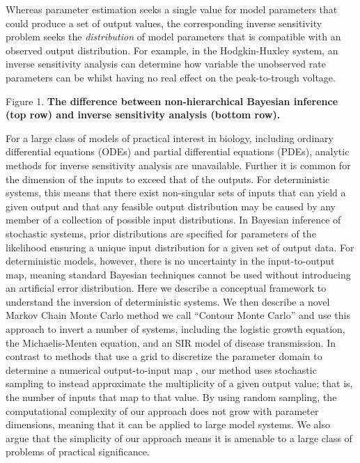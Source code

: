\documentclass[10pt,letterpaper]{article}
\begin{document}
Whereas parameter estimation seeks a single value for model parameters that could produce a set of output values, the corresponding inverse sensitivity problem seeks the \emph{distribution} of model parameters that is compatible with an observed output distribution. For example, in the Hodgkin-Huxley system, an inverse sensitivity analysis can determine how variable the unobserved rate parameters can be whilst having no real effect on the peak-to-trough voltage.

\vspace{0.5cm}

Figure 1. \textbf{The difference between non-hierarchical Bayesian inference (top row) and inverse sensitivity analysis (bottom row).} 

For a large class of models of practical interest in biology, including ordinary differential equations (ODEs) and partial differential equations (PDEs), analytic methods for inverse sensitivity analysis  are unavailable. Further it is common for the dimension of the inputs to exceed that of the outputs. For deterministic systems, this means that there exist non-singular sets of inputs that can yield a given output and that any feasible output distribution may be caused by any member of a collection of possible input distributions. In Bayesian inference of stochastic systems, prior distributions are specified for parameters of the likelihood ensuring a unique input distribution for a given set of output data. For deterministic models, however, there is no uncertainty in the input-to-output map, meaning standard Bayesian techniques cannot be used without introducing an artificial error distribution. Here we describe a conceptual framework to understand the inversion of deterministic systems. We then describe a novel Markov Chain Monte Carlo method we call ``Contour Monte Carlo'' and use this approach to invert a number of systems, including the logistic growth equation, the Michaelis-Menten equation, and an SIR model of disease transmission. In contrast to methods that use a grid to discretize the parameter domain to determine a numerical output-to-input map \cite{butler2014measure}, our method uses stochastic sampling to instead approximate the multiplicity of a given output value; that is, the number of inputs that map to that value. By using random sampling, the computational complexity of our approach does not grow with parameter dimensions, meaning that it can be applied to large model systems. We also argue that the simplicity of our approach means it is amenable to a large class of problems of practical significance.
\end{document}
